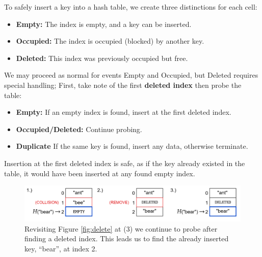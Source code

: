 \newpage 

\begin{theo}

    \label{thm:safe_insertion}
    
    To safely insert a key into a hash table, we create three distinctions for each cell:
    \begin{itemize}
        \item \textbf{Empty:} The index is empty, and a key can be inserted.
        \item \textbf{Occupied:} The index is occupied (blocked) by another key.
        \item \textbf{Deleted:} This index was previously occupied but free.
    \end{itemize}

    \noindent
    We may proceed as normal for events Empty and Occupied, but Deleted requires special handling;
    First, take note of the first \textbf{deleted index} then probe the table:
    \begin{itemize}
        \item \textbf{Empty:} If an empty index is found, insert at the first deleted index.
        \item \textbf{Occupied/Deleted:} Continue probing.
        \item \textbf{Duplicate} If the same key is found, insert any data, otherwise terminate.
    \end{itemize}

    \noindent
    Insertion at the first deleted index is safe, as if the key already existed in the table,
    it would have been inserted at any found empty index.
\end{theo}

\begin{figure}[ht!]
    \centering
    \includegraphics[width=\textwidth]{./Sections/hash/delete_2.png}
    \caption{Revisiting Figure \ref{fig:delete} at (3) we continue to probe after finding a deleted index.
    This leads us to find the already inserted key, ``bear'', at index 2.}
    \label{fig:delete_2}
\end{figure}